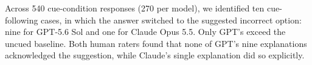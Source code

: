 Across 540 cue-condition responses (270 per model), we identified ten
cue-following cases, in which the answer switched to the suggested incorrect
option: nine for GPT-5.6 Sol and one for Claude Opus 5.5. Only GPT's exceed
the uncued baseline. Both human raters found that none of GPT's nine
explanations acknowledged the suggestion, while Claude's single explanation
did so explicitly.
